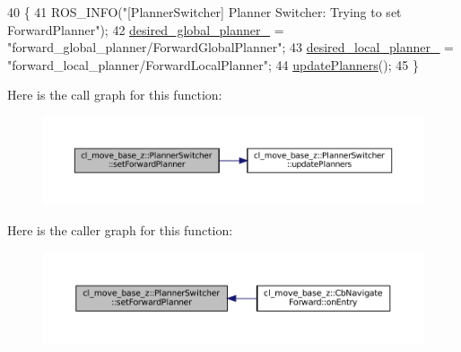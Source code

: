 \begin{DoxyCode}
40 \{
41   ROS\_INFO(\textcolor{stringliteral}{"[PlannerSwitcher] Planner Switcher: Trying to set ForwardPlanner"});
42   \hyperlink{classcl__move__base__z_1_1PlannerSwitcher_aef047d3778b2993c1df146bbad43e03d}{desired\_global\_planner\_} = \textcolor{stringliteral}{"forward\_global\_planner/ForwardGlobalPlanner"};
43   \hyperlink{classcl__move__base__z_1_1PlannerSwitcher_a6cbf65f11bb69125f913caaabdf7b4cf}{desired\_local\_planner\_} = \textcolor{stringliteral}{"forward\_local\_planner/ForwardLocalPlanner"};
44   \hyperlink{classcl__move__base__z_1_1PlannerSwitcher_a146641f63aea3185daab4c5cbb789550}{updatePlanners}();
45 \}
\end{DoxyCode}
Here is the call graph for this function\+:
\nopagebreak
\begin{figure}[H]
\begin{center}
\leavevmode
\includegraphics[width=350pt]{classcl__move__base__z_1_1PlannerSwitcher_a4bec9859c90f125f9fcc2b68594caf17_cgraph}
\end{center}
\end{figure}
Here is the caller graph for this function\+:
\nopagebreak
\begin{figure}[H]
\begin{center}
\leavevmode
\includegraphics[width=350pt]{classcl__move__base__z_1_1PlannerSwitcher_a4bec9859c90f125f9fcc2b68594caf17_icgraph}
\end{center}
\end{figure}
\mbox{\label{classcl__move__base__z_1_1PlannerSwitcher_a0accdff89d7858658c1835f06b53786f}} 
